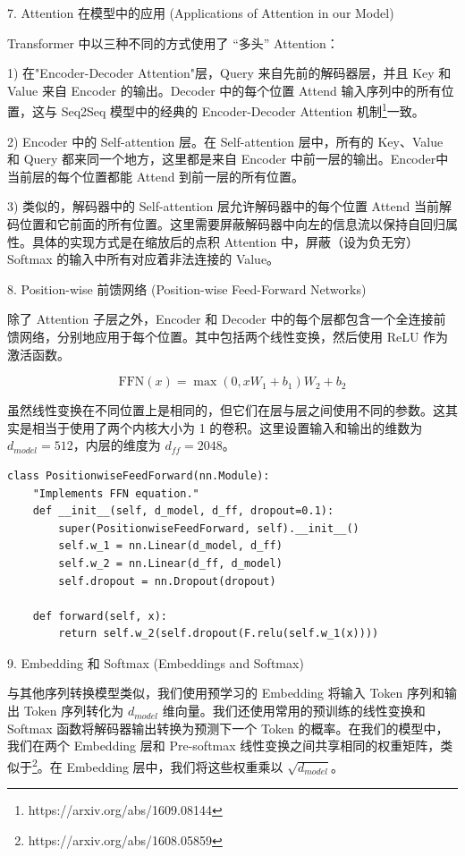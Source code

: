 7. Attention 在模型中的应用 (Applications of Attention in our Model)

Transformer 中以三种不同的方式使用了 “多头” Attention：

1) 在"Encoder-Decoder Attention"层，Query 来自先前的解码器层，并且 Key 和 Value 来自 Encoder 的输出。Decoder 中的每个位置 Attend 输入序列中的所有位置，这与 Seq2Seq 模型中的经典的 Encoder-Decoder Attention 机制\footnote{https://arxiv.org/abs/1609.08144}一致。

2) Encoder 中的 Self-attention 层。在 Self-attention 层中，所有的 Key、Value 和 Query 都来同一个地方，这里都是来自 Encoder 中前一层的输出。Encoder中当前层的每个位置都能 Attend 到前一层的所有位置。

3) 类似的，解码器中的 Self-attention 层允许解码器中的每个位置 Attend 当前解码位置和它前面的所有位置。这里需要屏蔽解码器中向左的信息流以保持自回归属性。具体的实现方式是在缩放后的点积 Attention 中，屏蔽（设为负无穷）Softmax 的输入中所有对应着非法连接的 Value。

8. Position-wise 前馈网络 (Position-wise Feed-Forward Networks)

除了 Attention 子层之外，Encoder 和 Decoder 中的每个层都包含一个全连接前馈网络，分别地应用于每个位置。其中包括两个线性变换，然后使用 ReLU 作为激活函数。

\begin{equation}
\mathrm{FFN}(x)=\max \left(0, x W_{1}+b_{1}\right) W_{2}+b_{2}
\end{equation}

虽然线性变换在不同位置上是相同的，但它们在层与层之间使用不同的参数。这其实是相当于使用了两个内核大小为 1 的卷积。这里设置输入和输出的维数为 $d_{model} = 512$，内层的维度为 $d_{ff} = 2048$。

\begin{Verbatim}
class PositionwiseFeedForward(nn.Module):
    "Implements FFN equation."
    def __init__(self, d_model, d_ff, dropout=0.1):
        super(PositionwiseFeedForward, self).__init__()
        self.w_1 = nn.Linear(d_model, d_ff)
        self.w_2 = nn.Linear(d_ff, d_model)
        self.dropout = nn.Dropout(dropout)

    def forward(self, x):
        return self.w_2(self.dropout(F.relu(self.w_1(x))))
\end{Verbatim}

9. Embedding 和 Softmax (Embeddings and Softmax)

与其他序列转换模型类似，我们使用预学习的 Embedding 将输入 Token 序列和输出 Token 序列转化为 $d_{model}$ 维向量。我们还使用常用的预训练的线性变换和 Softmax 函数将解码器输出转换为预测下一个 Token 的概率。在我们的模型中，我们在两个 Embedding 层和 Pre-softmax 线性变换之间共享相同的权重矩阵，类似于\footnote{https://arxiv.org/abs/1608.05859}。在 Embedding 层中，我们将这些权重乘以 $\sqrt{d_{model}}$。

